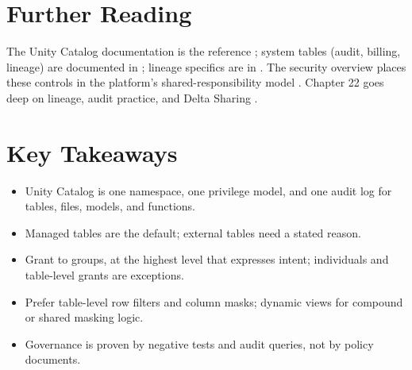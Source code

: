 \section{Further Reading}
The Unity Catalog documentation is the reference \cite{databricksUnityCatalog}; system tables (audit, billing, lineage) are documented in \cite{databricksSystemTables}; lineage specifics are in \cite{databricksLineage}. The security overview places these controls in the platform's shared-responsibility model \cite{databricksSecurity}. Chapter 22 goes deep on lineage, audit practice, and Delta Sharing \cite{databricksDeltaSharing}.

\section*{Key Takeaways}
\begin{itemize}
    \item Unity Catalog is one namespace, one privilege model, and one audit log for tables, files, models, and functions.
    \item Managed tables are the default; external tables need a stated reason.
    \item Grant to groups, at the highest level that expresses intent; individuals and table-level grants are exceptions.
    \item Prefer table-level row filters and column masks; dynamic views for compound or shared masking logic.
    \item Governance is proven by negative tests and audit queries, not by policy documents.
\end{itemize}

